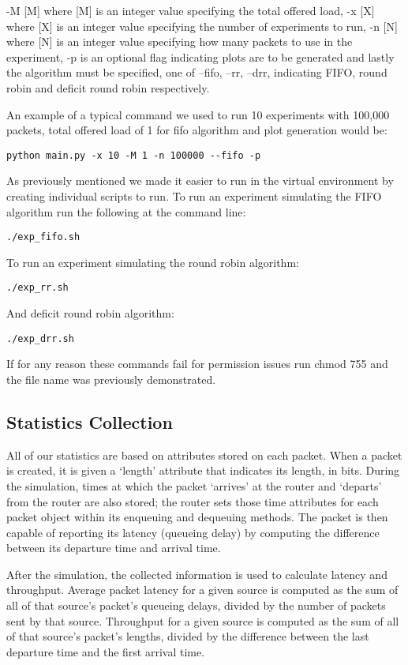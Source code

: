 -M [M] where [M] is an integer value specifying the total offered load, -x [X] where [X] is an integer value specifying the number of experiments to run, -n [N] where [N] is an integer value specifying how many packets to use in the experiment, -p is an optional flag indicating plots are to be generated and lastly the algorithm must be specified, one of --fifo, --rr, --drr, indicating FIFO, round robin and deficit round robin respectively.

An example of a typical command we used to run 10 experiments with 100,000 packets, total offered load of 1 for fifo algorithm and plot generation would be:

\begin{lstlisting}
python main.py -x 10 -M 1 -n 100000 --fifo -p
\end{lstlisting}

As previously mentioned we made it easier to run in the virtual environment by creating individual scripts to run. To run an experiment simulating the FIFO algorithm run the following at the command line:

\begin{lstlisting}
./exp_fifo.sh
\end{lstlisting}

To run an experiment simulating the round robin algorithm:

\begin{lstlisting}
./exp_rr.sh
\end{lstlisting}

And deficit round robin algorithm:

\begin{lstlisting}
./exp_drr.sh
\end{lstlisting}

If for any reason these commands fail for permission issues run chmod 755 and the file name was previously demonstrated.

\subsection{Statistics Collection}

All of our statistics are based on attributes stored on each packet.
When a packet is created, it is given a `length' attribute that indicates its length, in bits.
During the simulation, times at which the packet `arrives' at the router and `departs' from the router are also stored;
the router sets those time attributes for each packet object within its enqueuing and dequeuing methods.
The packet is then capable of reporting its latency (queueing delay) by computing the difference between its departure time and arrival time.

After the simulation, the collected information is used to calculate latency and throughput.
Average packet latency for a given source is computed as the sum of all of that source's packet's queueing delays, divided by the number of packets sent by that source.
Throughput for a given source is computed as the sum of all of that source's packet's lengths, divided by the difference between the last departure time and the first arrival time.
